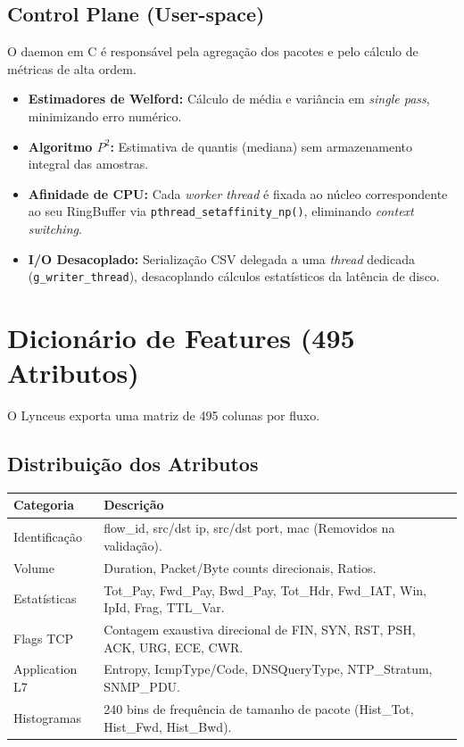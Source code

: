 \documentclass[12pt,a4paper]{article}
\begin{document}
\subsection{Control Plane (User-space)}
O daemon em C \'{e} respons\'{a}vel pela agrega\c{c}\~{a}o dos pacotes e pelo c\'{a}lculo de m\'{e}tricas de alta ordem.
\begin{itemize}
    \item \textbf{Estimadores de Welford:} C\'{a}lculo de m\'{e}dia e vari\^{a}ncia em \textit{single pass}, minimizando erro num\'{e}rico.
    \item \textbf{Algoritmo $P^2$:} Estimativa de quantis (mediana) sem armazenamento integral das amostras.
    \item \textbf{Afinidade de CPU:} Cada \textit{worker thread} \'{e} fixada ao n\'{u}cleo correspondente ao seu RingBuffer via \texttt{pthread\_setaffinity\_np()}, eliminando \textit{context switching}.
    \item \textbf{I/O Desacoplado:} Serializa\c{c}\~{a}o CSV delegada a uma \textit{thread} dedicada (\texttt{g\_writer\_thread}), desacoplando c\'{a}lculos estat\'{i}sticos da lat\^{e}ncia de disco.
\end{itemize}

\section{Dicion\'{a}rio de Features (495 Atributos)}
O Lynceus exporta uma matriz de 495 colunas por fluxo.

\subsection{Distribui\c{c}\~{a}o dos Atributos}
\begin{longtable}{p{4cm} p{10cm}}
\toprule
Categoria & Descri\c{c}\~{a}o \\
\midrule
Identifica\c{c}\~{a}o & flow\_id, src/dst ip, src/dst port, mac (Removidos na valida\c{c}\~{a}o). \\
Volume & Duration, Packet/Byte counts direcionais, Ratios. \\
Estat\'{i}sticas & Tot\_Pay, Fwd\_Pay, Bwd\_Pay, Tot\_Hdr, Fwd\_IAT, Win, IpId, Frag, TTL\_Var. \\
Flags TCP & Contagem exaustiva direcional de FIN, SYN, RST, PSH, ACK, URG, ECE, CWR. \\
Application L7 & Entropy, IcmpType/Code, DNSQueryType, NTP\_Stratum, SNMP\_PDU. \\
Histogramas & 240 bins de frequ\^{e}ncia de tamanho de pacote (Hist\_Tot, Hist\_Fwd, Hist\_Bwd). \\
\bottomrule
\end{longtable}
\end{document}
